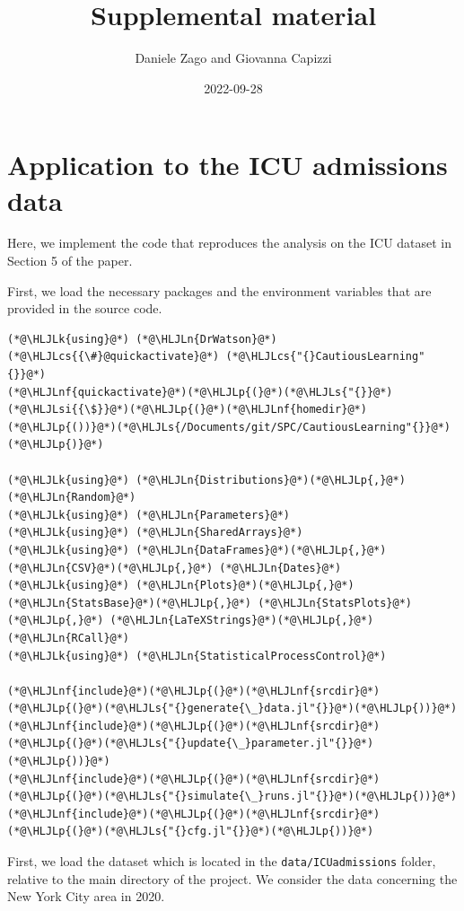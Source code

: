 \documentclass[12pt,a4paper]{article}
\title{ Supplemental material }
\author{ Daniele Zago and Giovanna Capizzi }
\date{ 2022-09-28 }
\newcommand{\HLJLk}[1]{\textcolor[RGB]{148,91,176}{\textbf{#1}}}
\newcommand{\HLJLn}[1]{#1}
\newcommand{\HLJLnf}[1]{\textcolor[RGB]{66,102,213}{#1}}
\newcommand{\HLJLs}[1]{\textcolor[RGB]{201,61,57}{#1}}
\newcommand{\HLJLsi}[1]{#1}
\newcommand{\HLJLp}[1]{#1}
\newcommand{\HLJLcs}[1]{\textcolor[RGB]{153,153,119}{\textit{#1}}}
\begin{document}
\maketitle



\section{Application to the ICU admissions data}
Here, we implement the code that reproduces the analysis on the ICU dataset in Section 5 of the paper.

First, we load the necessary packages and the environment variables that are provided in the source code.



\begin{lstlisting}
(*@\HLJLk{using}@*) (*@\HLJLn{DrWatson}@*)
(*@\HLJLcs{{\#}@quickactivate}@*) (*@\HLJLcs{"{}CautiousLearning"{}}@*)
(*@\HLJLnf{quickactivate}@*)(*@\HLJLp{(}@*)(*@\HLJLs{"{}}@*)(*@\HLJLsi{{\$}}@*)(*@\HLJLp{(}@*)(*@\HLJLnf{homedir}@*)(*@\HLJLp{())}@*)(*@\HLJLs{/Documents/git/SPC/CautiousLearning"{}}@*)(*@\HLJLp{)}@*)

(*@\HLJLk{using}@*) (*@\HLJLn{Distributions}@*)(*@\HLJLp{,}@*) (*@\HLJLn{Random}@*)
(*@\HLJLk{using}@*) (*@\HLJLn{Parameters}@*)
(*@\HLJLk{using}@*) (*@\HLJLn{SharedArrays}@*)
(*@\HLJLk{using}@*) (*@\HLJLn{DataFrames}@*)(*@\HLJLp{,}@*) (*@\HLJLn{CSV}@*)(*@\HLJLp{,}@*) (*@\HLJLn{Dates}@*)
(*@\HLJLk{using}@*) (*@\HLJLn{Plots}@*)(*@\HLJLp{,}@*) (*@\HLJLn{StatsBase}@*)(*@\HLJLp{,}@*) (*@\HLJLn{StatsPlots}@*)(*@\HLJLp{,}@*) (*@\HLJLn{LaTeXStrings}@*)(*@\HLJLp{,}@*) (*@\HLJLn{RCall}@*)
(*@\HLJLk{using}@*) (*@\HLJLn{StatisticalProcessControl}@*)

(*@\HLJLnf{include}@*)(*@\HLJLp{(}@*)(*@\HLJLnf{srcdir}@*)(*@\HLJLp{(}@*)(*@\HLJLs{"{}generate{\_}data.jl"{}}@*)(*@\HLJLp{))}@*)
(*@\HLJLnf{include}@*)(*@\HLJLp{(}@*)(*@\HLJLnf{srcdir}@*)(*@\HLJLp{(}@*)(*@\HLJLs{"{}update{\_}parameter.jl"{}}@*)(*@\HLJLp{))}@*)
(*@\HLJLnf{include}@*)(*@\HLJLp{(}@*)(*@\HLJLnf{srcdir}@*)(*@\HLJLp{(}@*)(*@\HLJLs{"{}simulate{\_}runs.jl"{}}@*)(*@\HLJLp{))}@*)
(*@\HLJLnf{include}@*)(*@\HLJLp{(}@*)(*@\HLJLnf{srcdir}@*)(*@\HLJLp{(}@*)(*@\HLJLs{"{}cfg.jl"{}}@*)(*@\HLJLp{))}@*)
\end{lstlisting}


First, we load the dataset which is located in the \texttt{data/ICUadmissions} folder, relative to the main directory of the project. We consider the data concerning the New York City area in 2020.
\end{document}
